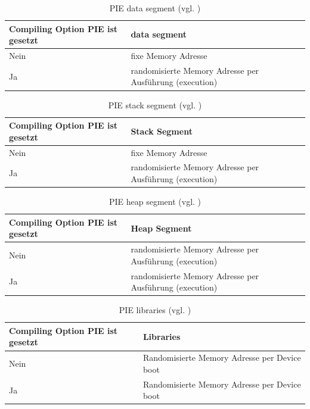  \begin{table}
    \begin{center}
       \begin{tabular}{|p{6cm}|p{9cm}|} \hline
            Compiling Option PIE ist gesetzt & data segment\\ \hline
            Nein & fixe Memory Adresse\\ \hline
            Ja & randomisierte Memory Adresse per Ausführung (execution)\\ \hline
        \end{tabular}
        \caption{PIE data segment (vgl. \cite{iOSSec[5]})}
       \label{tab:PIE data segment}
    \end{center}
\end{table}

\begin{table}
    \begin{center}
        \begin{tabular}{|p{6cm}|p{9cm}|} \hline
            Compiling Option PIE ist gesetzt & Stack Segment\\ \hline
            Nein & fixe Memory Adresse\\ \hline
             Ja & randomisierte Memory Adresse per Ausführung (execution)\\ \hline
        \end{tabular}
         \caption{PIE stack segment (vgl. \cite{iOSSec[5]})}
       \label{tab:PIE stack segment}
    \end{center}
\end{table}    

\begin{table}
    \begin{center}
       \begin{tabular}{|p{6cm}|p{9cm}|} \hline
            Compiling Option PIE ist gesetzt & Heap Segment\\ \hline
            Nein & randomisierte Memory Adresse per Ausführung (execution)\\ \hline
            Ja & randomisierte Memory Adresse per Ausführung (execution)\\ \hline
        \end{tabular}
        \caption{PIE heap segment (vgl. \cite{iOSSec[5]}) }
       \label{tab:PIE heap segment}
    \end{center}
\end{table}

\begin{table}
    \begin{center}
      \begin{tabular}{|p{6cm}|p{9cm}|} \hline
            Compiling Option PIE ist gesetzt & Libraries \\ \hline
            Nein & Randomisierte Memory Adresse per Device boot\\ \hline
            Ja & Randomisierte Memory Adresse per Device boot \\ \hline
        \end{tabular}
        \caption{PIE libraries (vgl. \cite{iOSSec[5]})}
       \label{tab:PIE libraries}
    \end{center}
\end{table}

